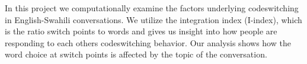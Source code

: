 In this project we computationally examine the factors underlying codeswitching in English-Swahili conversations. We utilize the integration index (I-index), which is the ratio switch points to words and gives us insight into how people are responding to each others codeswitching behavior. Our analysis shows how the word choice at switch points is affected by the topic of the conversation.
